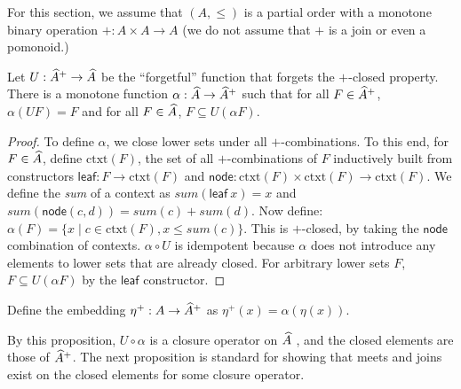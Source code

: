 For this section, we assume that $(A, \leq)$ is a partial order with a
monotone binary operation $+ : A \times A \to A$ (we do not assume
that $+$ is a join or even a pomonoid.)


\begin{prop}
  Let $U : \widehat{A}^+ \to \widehat{A}$ be the ``forgetful''
  function that forgets the $+$-closed property. There is a monotone
  function $\alpha : \widehat{A} \to \widehat{A}^+$ such that
  for all $F \in \widehat{A}^+$, $\alpha(U F) = F$ and for all
  $F \in \widehat{A}$, $F \subseteq U (\alpha F)$.
\end{prop}

\begin{proof}
  To define $\alpha$, we close lower sets under all
  $+$-combinations. To this end, for $F \in \widehat{A}$, define
  $\mathrm{ctxt}(F)$, the set of all $+$-combinations of $F$
  inductively built from constructors
  $\mathsf{leaf} : F \to \mathrm{ctxt}(F)$ and
  $\mathsf{node} : \mathrm{ctxt}(F) \times \mathrm{ctxt}(F) \to
    \mathrm{ctxt}(F)$. We define the \emph{sum} of a context as
  $\mathit{sum}(\mathsf{leaf}~x) = x$ and
  $\mathit{sum}(\mathsf{node}(c,d)) = \mathit{sum}(c) +
    \mathit{sum}(d)$. Now define:
  $\alpha(F) = \{ x \mid c \in \mathrm{ctxt}(F), x \leq
    \mathit{sum}(c) \}$. This is $+$-closed, by taking the
  $\mathsf{node}$ combination of contexts. $\alpha \circ U$ is
  idempotent because $\alpha$ does not introduce any elements to lower
  sets that are already closed. For arbitrary lower sets $F$,
  $F \subseteq U(\alpha F)$ by the $\mathsf{leaf}$ constructor.
\end{proof}

\begin{defi}
  Define the embedding $\eta^+ : A \to \widehat{A}^+$ as
  $\eta^+(x) = \alpha(\eta(x))$.
\end{defi}

\begin{rem}
  By this proposition, $U \circ \alpha$ is a closure operator on
  $\widehat{A}$ \cite{Davey_2002}, and the closed elements are
  those of $\widehat{A}^+$. The next proposition is standard for
  showing that meets and joins exist on the closed elements for some
  closure operator.
\end{rem}

